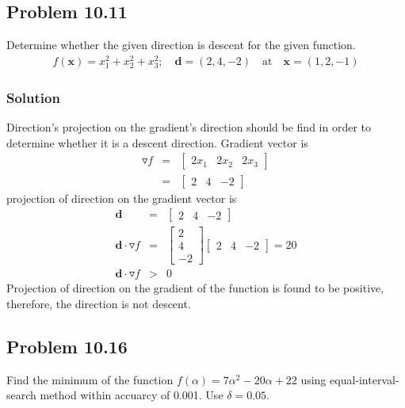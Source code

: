 \documentclass[]{report}
\begin{document}
\subsection*{Problem 10.11}
Determine whether the given direction is descent for the given function.
\begin{eqnarray*}
f\left(\mathbf x\right)=x_1^2+x_2^2+x_3^2 ; \quad \mathbf d=\left(2,4,-2\right)\quad \mathrm{at} \quad \mathbf{x}=\left(1,2,-1\right)
\end{eqnarray*}
\subsubsection*{Solution}
Direction's projection on the gradient's direction should be find in order to determine whether it is a descent direction. Gradient vector is
\begin{eqnarray*}
\mathbf \triangledown f&=&\left[\begin{array}{ccc}
2x_1& 2x_2& 2x_3
\end{array}\right]
\\
&=&\left[\begin{array}{ccc}
2 &4& -2
\end{array}\right]
\end{eqnarray*}
projection of direction on the gradient vector is
\begin{eqnarray*}
\mathbf d&=&\left[\begin{array}{ccc}
2 &4& -2
\end{array}\right]
\\
\mathbf d \cdot  \mathbf \triangledown f &=&\left[\begin{array}{c}
2 \\4\\ -2
\end{array}\right]\left[\begin{array}{ccc}
2 &4& -2
\end{array}\right]=20\\
\mathbf d \cdot  \mathbf \triangledown f &>& 0 
\end{eqnarray*}
Projection of direction on the gradient of the function is found to be positive, therefore, the direction is not descent. 
\subsection*{Problem 10.16}
Find the minimum of the function $f\left(\alpha\right)=7\alpha^2-20\alpha+22$ using equal-interval-search method within accuarcy of 0.001. Use $\delta=0.05$.
\end{document}
